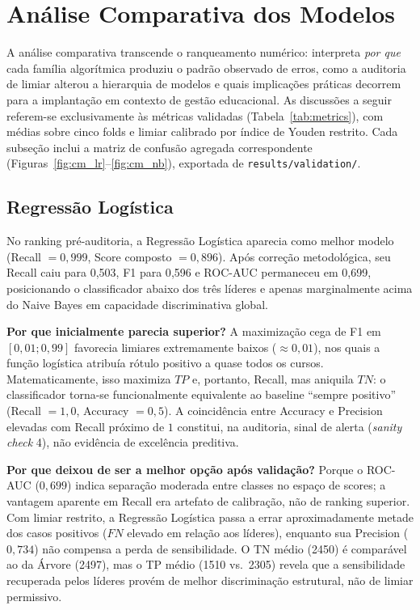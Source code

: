 \documentclass[conference]{IEEEtran}
\begin{document}
\section{Análise Comparativa dos Modelos}

A análise comparativa transcende o ranqueamento numérico: interpreta \textit{por que} cada família algorítmica produziu o padrão observado de erros, como a auditoria de limiar alterou a hierarquia de modelos e quais implicações práticas decorrem para a implantação em contexto de gestão educacional. As discussões a seguir referem-se exclusivamente às métricas validadas (Tabela~\ref{tab:metrics}), com médias sobre cinco folds e limiar calibrado por índice de Youden restrito. Cada subseção inclui a matriz de confusão agregada correspondente (Figuras~\ref{fig:cm_lr}--\ref{fig:cm_nb}), exportada de \texttt{results/validation/}.

\subsection{Regressão Logística}
No ranking pré-auditoria, a Regressão Logística aparecia como melhor modelo (Recall $= 0{,}999$, Score composto $= 0{,}896$). Após correção metodológica, seu Recall caiu para 0{,}503, F1 para 0{,}596 e ROC-AUC permaneceu em 0{,}699, posicionando o classificador abaixo dos três líderes e apenas marginalmente acima do Naive Bayes em capacidade discriminativa global.

\textbf{Por que inicialmente parecia superior?} A maximização cega de F1 em $[0{,}01; 0{,}99]$ favorecia limiares extremamente baixos ($\approx 0{,}01$), nos quais a função logística atribuía rótulo positivo a quase todos os cursos. Matematicamente, isso maximiza $TP$ e, portanto, Recall, mas aniquila $TN$: o classificador torna-se funcionalmente equivalente ao baseline ``sempre positivo'' (Recall $= 1{,}0$, Accuracy $= 0{,}5$). A coincidência entre Accuracy e Precision elevadas com Recall próximo de $1$ constitui, na auditoria, sinal de alerta (\textit{sanity check} 4), não evidência de excelência preditiva.

\textbf{Por que deixou de ser a melhor opção após validação?} Porque o ROC-AUC ($0{,}699$) indica separação moderada entre classes no espaço de scores; a vantagem aparente em Recall era artefato de calibração, não de ranking superior. Com limiar restrito, a Regressão Logística passa a errar aproximadamente metade dos casos positivos ($FN$ elevado em relação aos líderes), enquanto sua Precision ($0{,}734$) não compensa a perda de sensibilidade. O TN médio (2450) é comparável ao da Árvore (2497), mas o TP médio (1510 vs.\ 2305) revela que a sensibilidade recuperada pelos líderes provém de melhor discriminação estrutural, não de limiar permissivo.
\end{document}
